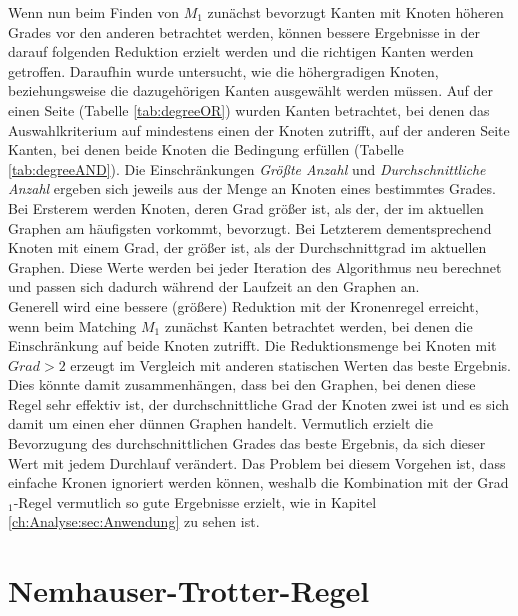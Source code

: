 Wenn nun beim Finden von $M_{1}$ zunächst bevorzugt Kanten mit Knoten höheren Grades vor den anderen betrachtet werden, können bessere Ergebnisse in der darauf folgenden Reduktion erzielt werden und die richtigen Kanten werden getroffen. Daraufhin wurde untersucht, wie die höhergradigen Knoten, beziehungsweise die dazugehörigen Kanten ausgewählt werden müssen. Auf der einen Seite (Tabelle \ref{tab:degreeOR}) wurden Kanten betrachtet, bei denen das Auswahlkriterium auf mindestens einen der Knoten zutrifft, auf der anderen Seite Kanten, bei denen beide Knoten die Bedingung erfüllen (Tabelle \ref{tab:degreeAND}). Die Einschränkungen \emph{Größte Anzahl} und \emph{Durchschnittliche Anzahl} ergeben sich jeweils aus der Menge an Knoten eines bestimmtes Grades. Bei Ersterem werden Knoten, deren Grad größer ist, als der, der im aktuellen Graphen am häufigsten vorkommt, bevorzugt. Bei Letzterem dementsprechend Knoten mit einem Grad, der größer ist, als der Durchschnittgrad im aktuellen Graphen. Diese Werte werden bei jeder Iteration des Algorithmus neu berechnet und passen sich dadurch während der Laufzeit an den Graphen an.\\ 
Generell wird eine bessere (größere) Reduktion mit der Kronenregel erreicht, wenn beim Matching $M_{1}$ zunächst Kanten betrachtet werden, bei denen die Einschränkung auf beide Knoten zutrifft. Die Reduktionsmenge bei Knoten mit $Grad>2$ erzeugt im Vergleich mit anderen statischen Werten das beste Ergebnis. Dies könnte damit zusammenhängen, dass bei den Graphen, bei denen diese Regel sehr effektiv ist, der durchschnittliche Grad der Knoten zwei ist und es sich damit um einen eher dünnen Graphen handelt. Vermutlich erzielt die Bevorzugung des durchschnittlichen Grades das beste Ergebnis, da sich dieser Wert mit jedem Durchlauf verändert.
Das Problem bei diesem Vorgehen ist, dass einfache Kronen ignoriert werden können, weshalb die Kombination mit der Grad$_{1}$-Regel vermutlich so gute Ergebnisse erzielt, wie in Kapitel \ref{ch:Analyse:sec:Anwendung} zu sehen ist.
\newpage




\section{Nemhauser-Trotter-Regel}
\label{ch:Implementierung:sec:Trott}

